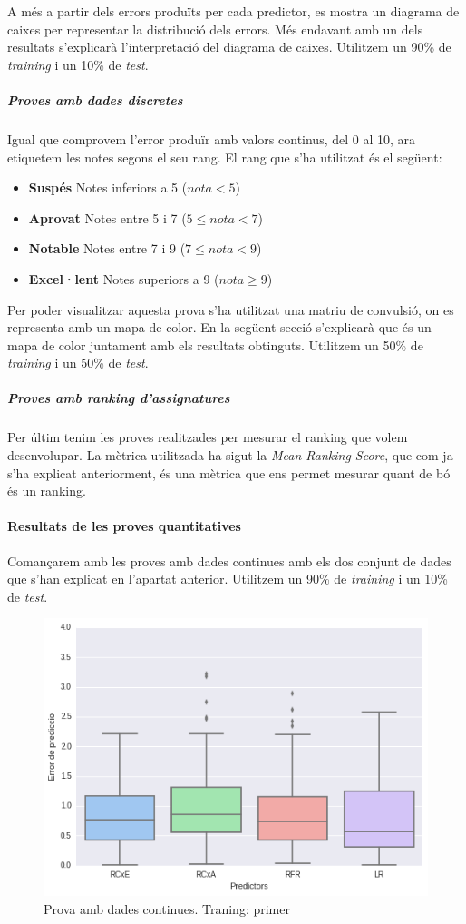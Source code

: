 \documentclass[12pt,a4paper,catalan]{article}
\begin{document}
A més a partir dels errors produïts per cada predictor, es mostra un diagrama de caixes per representar la distribució dels errors. Més endavant amb un dels resultats s'explicarà l'interpretació del diagrama de caixes. Utilitzem un 90\% de \textit{training} i un 10\% de \textit{test}.


\subparagraph{Proves amb dades discretes}
Igual que comprovem l'error produïr amb valors continus, del 0 al 10, ara etiquetem les notes segons el seu rang. El rang que s'ha utilitzat és el següent:

\begin{itemize}[leftmargin=.5in]
	\item \textbf{Suspés} Notes inferiors a 5 ($nota < 5$)
	\item \textbf{Aprovat} Notes entre 5 i 7 ($5 \leq nota < 7 $)
	\item \textbf{Notable} Notes entre 7 i 9 ($7 \leq nota < 9 $)
	\item \textbf{Excel·lent} Notes superiors a 9 ($nota \geq 9$)
\end{itemize}

Per poder visualitzar aquesta prova s'ha utilitzat una matriu de convulsió, on es representa amb un mapa de color. En la següent secció s'explicarà que és un mapa de color juntament amb els resultats obtinguts. Utilitzem un 50\% de \textit{training} i un 50\% de \textit{test}.

\subparagraph{Proves amb ranking d'assignatures}
Per últim tenim les proves realitzades per mesurar el ranking que volem desenvolupar. La mètrica utilitzada ha sigut la \textit{Mean Ranking Score}, que com ja s'ha explicat anteriorment, és una mètrica que ens permet mesurar quant de bó és un ranking.

\paragraph{Resultats de les proves quantitatives}
Comançarem amb les proves amb dades continues amb els dos conjunt de dades que s'han explicat en l'apartat anterior.  Utilitzem un 90\% de \textit{training} i un 10\% de \textit{test}.

\begin{figure}[h]
\centering
\includegraphics[width=.7\linewidth]{img/boxplot_primer_segon.png}
\caption{Prova amb dades continues. Traning: primer}
\end{figure}
\end{document}
